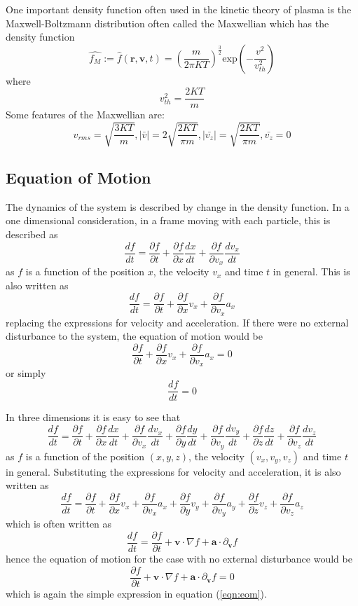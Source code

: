 \documentclass[12pt]{article}
\begin{document}
{	\noindent One important density function often used in the kinetic theory of plasma is the Maxwell-Boltzmann distribution often called the Maxwellian which has the density function 
	\begin{equation}
		\label{eqn:maxwellian}
		\widehat{f_{M}} := \hat{f}(\textbf{r}, \textbf{v}, t) = \left(\frac{m}{2\pi KT}\right)^{\frac{3}{2}} \mathrm{exp}\left(-\frac{v^{2}}{v_{th}^{2}}\right)
	\end{equation} where $$v_{th}^{2} = \frac{2 K T}{m}$$ Some features of the Maxwellian are:
	$$ v_{rms} = \sqrt{\frac{3 K T}{m}} \mathrm{,} |\bar{v}| = 2\sqrt{\frac{2 K T}{\pi m}} \mathrm{,} |\bar{v_{z}}| = \sqrt{\frac{2 K T}{\pi m}} \mathrm{,} \bar{v_{z}} = 0 $$
	
\subsection{Equation of Motion}
	The dynamics of the system is described by change in the density function. In a one dimensional consideration, in a frame moving with each particle, this is described as $$ \frac{df}{dt} = \frac{\partial f}{\partial t} + \frac{\partial f}{\partial x} \frac{d x}{d t} + \frac{\partial f}{\partial v_{x}} \frac{d v_{x}}{d t}$$ as $ f $ is a function of the position $x$, the velocity $v_{x}$ and time $t$ in general. This is also written as 
	$$ \frac{df}{dt} = \frac{\partial f}{\partial t} + \frac{\partial f}{\partial x} v_{x} + \frac{\partial f}{\partial v_{x}} a_{x} $$ replacing the expressions for velocity and acceleration. If there were no external disturbance to the system, the equation of motion would be
	$$ \frac{\partial f}{\partial t} + \frac{\partial f}{\partial x} v_{x} + \frac{\partial f}{\partial v_{x}} a_{x} = 0$$ or simply 
	\begin{equation}
		\label{eqn:eom}
		\frac{df}{dt} = 0
	\end{equation} 
	
	\noindent In three dimensions it is easy to see that
	$$ \frac{df}{dt} = \frac{\partial f}{\partial t} + \frac{\partial f}{\partial x} \frac{d x}{d t} + \frac{\partial f}{\partial v_{x}} \frac{d v_{x}}{d t} + \frac{\partial f}{\partial y} \frac{d y}{d t} + \frac{\partial f}{\partial v_{y}} \frac{d v_{y}}{d t} + \frac{\partial f}{\partial z} \frac{d z}{d t} + \frac{\partial f}{\partial v_{z}} \frac{d v_{z}}{d t}$$ as $ f $ is a function of the position $(x,y,z)$, the velocity $(v_{x},v_{y},v_{z})$ and time $t$ in general. Substituting the expressions for velocity and acceleration, it is also written as $$ \frac{df}{dt} = \frac{\partial f}{\partial t} + \frac{\partial f}{\partial x} v_{x} + \frac{\partial f}{\partial v_{x}} a_{x} + \frac{\partial f}{\partial y} v_{y} + \frac{\partial f}{\partial v_{y}} a_{y} + \frac{\partial f}{\partial z} v_{z} + \frac{\partial f}{\partial v_{z}} a_{z}$$ which is often written as $$\frac{df}{dt} = \frac{\partial f}{\partial t} + \textbf{v} \cdot \nabla f + \textbf{a} \cdot {\partial}_{\textbf{v}} f $$  hence the equation of motion for the case with no external disturbance would be $$\frac{\partial f}{\partial t} + \textbf{v} \cdot \nabla f + \textbf{a} \cdot {\partial}_{\textbf{v}} f = 0$$ which is again the simple expression in equation (\ref{eqn:eom}). \\
	
}
\end{document}
